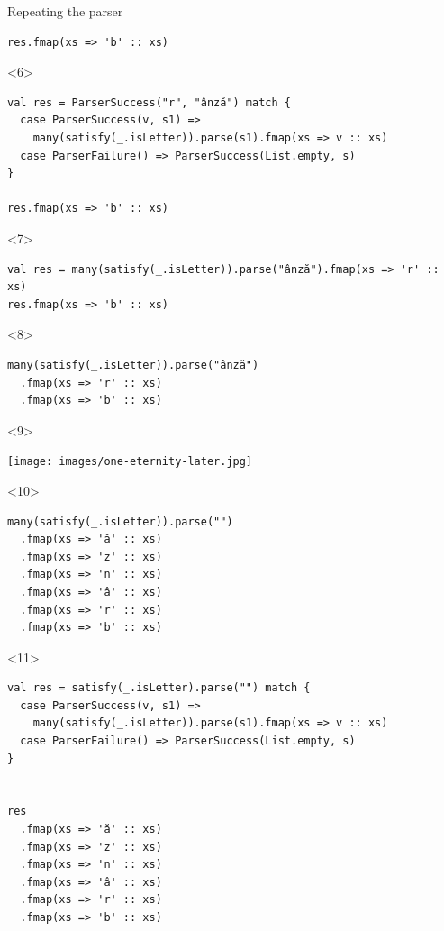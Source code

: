 \documentclass[presentation,aspectratio=169,smaller]{beamer}
\begin{document}
\begin{frame}[label={sec:orgad067d9},fragile,t]{Repeating the parser}
\begin{onlyenv}
\begin{verbatim}
res.fmap(xs => 'b' :: xs)
\end{verbatim}
\end{onlyenv}

\begin{onlyenv}<6>
\begin{verbatim}
val res = ParserSuccess("r", "ânză") match {
  case ParserSuccess(v, s1) =>
    many(satisfy(_.isLetter)).parse(s1).fmap(xs => v :: xs)
  case ParserFailure() => ParserSuccess(List.empty, s)
}

res.fmap(xs => 'b' :: xs)
\end{verbatim}
\end{onlyenv}

\begin{onlyenv}<7>
\begin{verbatim}
val res = many(satisfy(_.isLetter)).parse("ânză").fmap(xs => 'r' :: xs)
res.fmap(xs => 'b' :: xs)
\end{verbatim}
\end{onlyenv}

\begin{onlyenv}<8>
\begin{verbatim}
many(satisfy(_.isLetter)).parse("ânză")
  .fmap(xs => 'r' :: xs)
  .fmap(xs => 'b' :: xs)
\end{verbatim}
\end{onlyenv}

\begin{onlyenv}<9>
\begin{center}
\texttt{[image: images/one-eternity-later.jpg]}
\end{center}
\end{onlyenv}

\begin{onlyenv}<10>
\begin{verbatim}
many(satisfy(_.isLetter)).parse("")
  .fmap(xs => 'ă' :: xs)
  .fmap(xs => 'z' :: xs)
  .fmap(xs => 'n' :: xs)
  .fmap(xs => 'â' :: xs)
  .fmap(xs => 'r' :: xs)
  .fmap(xs => 'b' :: xs)
\end{verbatim}
\end{onlyenv}

\begin{onlyenv}<11>
\begin{verbatim}
val res = satisfy(_.isLetter).parse("") match {
  case ParserSuccess(v, s1) =>
    many(satisfy(_.isLetter)).parse(s1).fmap(xs => v :: xs)
  case ParserFailure() => ParserSuccess(List.empty, s)
}


res
  .fmap(xs => 'ă' :: xs)
  .fmap(xs => 'z' :: xs)
  .fmap(xs => 'n' :: xs)
  .fmap(xs => 'â' :: xs)
  .fmap(xs => 'r' :: xs)
  .fmap(xs => 'b' :: xs)
\end{verbatim}
\end{onlyenv}


\end{frame}
\end{document}
